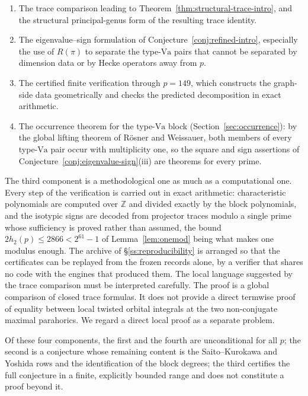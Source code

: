 \documentclass[10pt,a4paper]{amsart}
\newcommand{\Z}{\mathbb{Z}}
\newcommand{\Va}{\mathrm{Va}}
\providecommand{\Va}{\mathrm{Va}}
\begin{document}
	\begin{enumerate}[label=\textup{(\roman*)},leftmargin=2.5em]
		\item The trace comparison leading to
		Theorem~\ref{thm:structural-trace-intro}, and the structural
		principal-genus form of the resulting trace identity.
		\item The eigenvalue--sign formulation of
		Conjecture~\ref{conj:refined-intro}, especially the use of $R(\pi)$ to
		separate the type-$\mathrm{Va}$ pairs that cannot be separated by
		dimension data or by Hecke operators away from $p$.
		\item The certified finite verification through $p=149$, which constructs
		the graph-side data geometrically and checks the predicted decomposition in
		exact arithmetic.
		\item The occurrence theorem for the type-$\Va$ block
		(Section~\ref{sec:occurrence}): by the global lifting theorem of
		R\"osner and Weissauer, both members of every type-$\Va$ pair occur
		with multiplicity one, so the square and sign assertions of
		Conjecture~\ref{conj:eigenvalue-sign}\textup{(iii)} are theorems for
		every prime.
	\end{enumerate}
	The third component is a methodological one as much as a computational one.
	Every step of the verification is carried out in exact arithmetic:
	characteristic polynomials are computed over $\Z$ and divided exactly by the
	block polynomials, and the isotypic signs are decoded from projector traces
	modulo a single prime whose sufficiency is proved rather than assumed, the
	bound $2h_2(p)\le2866<2^{61}-1$ of Lemma~\ref{lem:onemod} being what makes
	one modulus enough. The archive of \S\ref{ss:reproducibility} is arranged so
	that the certificates can be replayed from the frozen records alone, by a
	verifier that shares no code with the engines that produced them.
	The local language suggested by the trace comparison must be interpreted
	carefully. The proof is a global comparison of closed trace formulas. It
	does not provide a direct termwise proof of equality between local twisted
	orbital integrals at the two non-conjugate maximal parahorics. We regard a
	direct local proof as a separate problem.
	
	Of these four components, the first and the fourth are unconditional for all $p$; the second is a conjecture whose remaining content is the Saito--Kurokawa and Yoshida rows and the identification of the block degrees; the third certifies the full conjecture in a finite, explicitly bounded range and does not constitute a proof beyond it.
	
\end{document}
